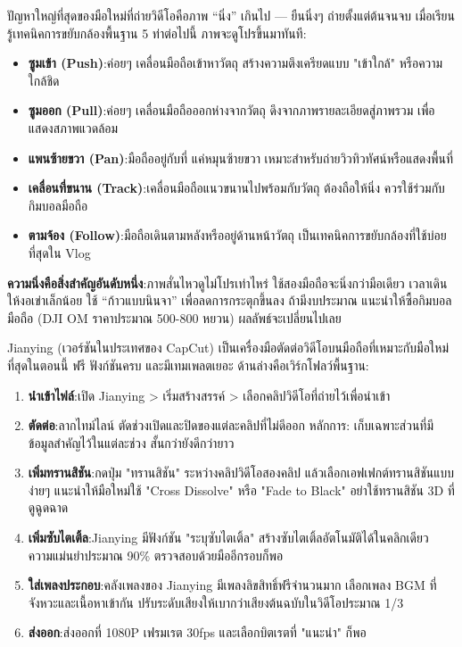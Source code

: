 
ปัญหาใหญ่ที่สุดของมือใหม่ที่ถ่ายวิดีโอคือภาพ “นิ่ง” เกินไป — ยืนนิ่งๆ ถ่ายตั้งแต่ต้นจนจบ เมื่อเรียนรู้เทคนิคการขยับกล้องพื้นฐาน 5 ท่าต่อไปนี้ ภาพจะดูโปรขึ้นมาทันที:

\begin{itemize}
  \item \textbf{ซูมเข้า (Push)}:ค่อยๆ เคลื่อนมือถือเข้าหาวัตถุ สร้างความตึงเครียดแบบ "เข้าใกล้" หรือความใกล้ชิด
  \item \textbf{ซูมออก (Pull)}:ค่อยๆ เคลื่อนมือถือออกห่างจากวัตถุ ดึงจากภาพรายละเอียดสู่ภาพรวม เพื่อแสดงสภาพแวดล้อม
  \item \textbf{แพนซ้ายขวา (Pan)}:มือถืออยู่กับที่ แค่หมุนซ้ายขวา เหมาะสำหรับถ่ายวิวทิวทัศน์หรือแสดงพื้นที่
  \item \textbf{เคลื่อนที่ขนาน (Track)}:เคลื่อนมือถือแนวขนานไปพร้อมกับวัตถุ ต้องถือให้นิ่ง ควรใช้ร่วมกับกิมบอลมือถือ
  \item \textbf{ตามจ้อง (Follow)}:มือถือเดินตามหลังหรืออยู่ด้านหน้าวัตถุ เป็นเทคนิคการขยับกล้องที่ใช้บ่อยที่สุดใน Vlog
\end{itemize}

\textbf{ความนิ่งคือสิ่งสำคัญอันดับหนึ่ง}:ภาพสั่นไหวดูไม่โปรเท่าไหร่ ใช้สองมือถือจะนิ่งกว่ามือเดียว เวลาเดินให้งอเข่าเล็กน้อย ใช้ “ก้าวแบบนินจา” เพื่อลดการกระตุกขึ้นลง ถ้ามีงบประมาณ แนะนำให้ซื้อกิมบอลมือถือ (DJI OM ราคาประมาณ 500-800 หยวน) ผลลัพธ์จะเปลี่ยนไปเลย


Jianying (เวอร์ชันในประเทศของ CapCut) เป็นเครื่องมือตัดต่อวิดีโอบนมือถือที่เหมาะกับมือใหม่ที่สุดในตอนนี้ ฟรี ฟังก์ชันครบ และมีเทมเพลตเยอะ ด้านล่างคือเวิร์กโฟลว์พื้นฐาน:

\begin{enumerate}
  \item \textbf{นำเข้าไฟล์}:เปิด Jianying > เริ่มสร้างสรรค์ > เลือกคลิปวิดีโอที่ถ่ายไว้เพื่อนำเข้า
  \item \textbf{ตัดต่อ}:ลากไทม์ไลน์ ตัดช่วงเปิดและปิดของแต่ละคลิปที่ไม่ดีออก หลักการ: เก็บเฉพาะส่วนที่มีข้อมูลสำคัญไว้ในแต่ละช่วง สั้นกว่ายังดีกว่ายาว
  \item \textbf{เพิ่มทรานสิชัน}:กดปุ่ม "ทรานสิชัน" ระหว่างคลิปวิดีโอสองคลิป แล้วเลือกเอฟเฟกต์ทรานสิชันแบบง่ายๆ แนะนำให้มือใหม่ใช้ "Cross Dissolve" หรือ "Fade to Black" อย่าใช้ทรานสิชัน 3D ที่ดูฉูดฉาด
  \item \textbf{เพิ่มซับไตเติ้ล}:Jianying มีฟังก์ชัน "ระบุซับไตเติ้ล" สร้างซับไตเติ้ลอัตโนมัติได้ในคลิกเดียว ความแม่นยำประมาณ 90\% ตรวจสอบด้วยมืออีกรอบก็พอ
  \item \textbf{ใส่เพลงประกอบ}:คลังเพลงของ Jianying มีเพลงลิขสิทธิ์ฟรีจำนวนมาก เลือกเพลง BGM ที่จังหวะและเนื้อหาเข้ากัน ปรับระดับเสียงให้เบากว่าเสียงต้นฉบับในวิดีโอประมาณ 1/3
  \item \textbf{ส่งออก}:ส่งออกที่ 1080P เฟรมเรต 30fps และเลือกบิตเรตที่ "แนะนำ" ก็พอ
\end{enumerate}


